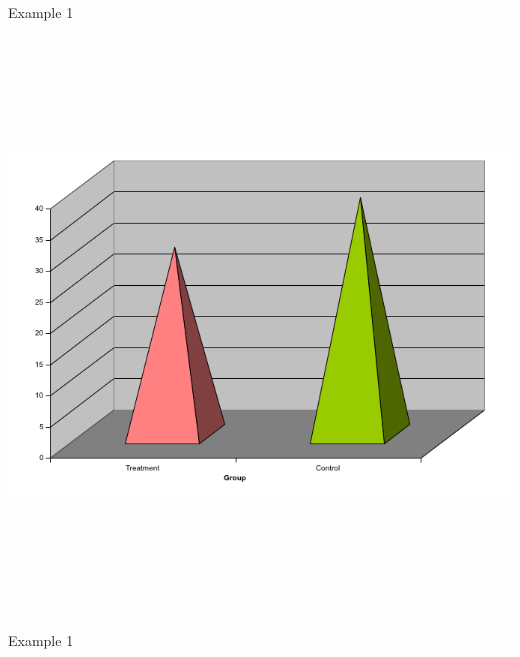 \documentclass[12pt]{article}
\newcommand{\headsize}{\fontsize{35}{35} \selectfont}
\begin{document}
\newpage


\headsize \color{yellow}
\hfill \begin{minipage}{5.75in}
\centering
Example 1
\end{minipage}

\vspace{30mm}

\centerline{\includegraphics[height=6in]{Figs/fig1g.png}}


\newpage


\headsize \color{yellow}
\hfill \begin{minipage}{5.75in}
\centering
Example 1
\end{minipage}

\vspace{30mm}
\end{document}
